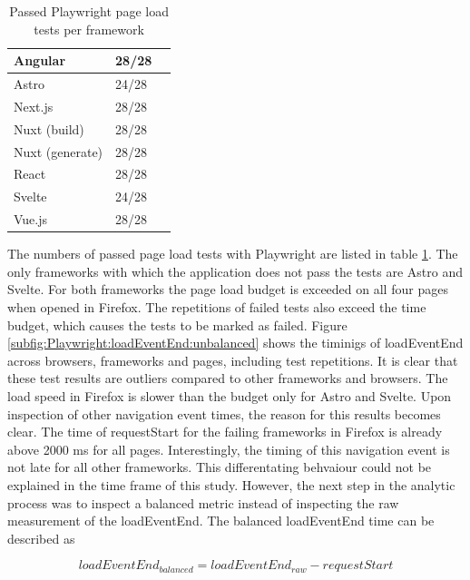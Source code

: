 \documentclass[a4paper, 12pt]{article}
\begin{document}
\begin{table}[!ht]
  \centering
  \begin{tabular}{|l|l|l|}
    \hline
    Angular         & 28/28 \\ \hline
    Astro           & 24/28 \\ \hline
    Next.js         & 28/28 \\ \hline
    Nuxt (build)    & 28/28 \\ \hline
    Nuxt (generate) & 28/28 \\ \hline
    React           & 28/28 \\ \hline
    Svelte          & 24/28 \\ \hline
    Vue.js          & 28/28 \\ \hline
  \end{tabular}
  \caption{Passed Playwright page load tests per framework}
  \label{tab:playwright:pageLoad}
\end{table}

The numbers of passed page load tests with Playwright are listed in table \ref{tab:playwright:pageLoad}.
The only frameworks with which the application does not pass the tests are Astro and Svelte.
For both frameworks the page load budget is exceeded on all four pages when opened in Firefox.
The repetitions of failed tests also exceed the time budget, which causes the tests to be marked as failed.
Figure \ref{subfig:Playwright:loadEventEnd:unbalanced} shows the timinigs of loadEventEnd across browsers, frameworks and pages, including test repetitions.
It is clear that these test results are outliers compared to other frameworks and browsers.
The load speed in Firefox is slower than the budget only for Astro and Svelte.
Upon inspection of other navigation event times, the reason for this results becomes clear.
The time of requestStart for the failing frameworks in Firefox is already above 2000 ms for all pages.
Interestingly, the timing of this navigation event is not late for all other frameworks.
This differentating behvaiour could not be explained in the time frame of this study.
However, the next step in the analytic process was to inspect a balanced metric instead of inspecting the raw measurement of the loadEventEnd.
The balanced loadEventEnd time can be described as

\begin{equation}
\mathit{loadEventEnd}_\mathit{balanced} = \mathit{loadEventEnd}_\mathit{raw} - \mathit{requestStart}
\end{equation}
\end{document}
